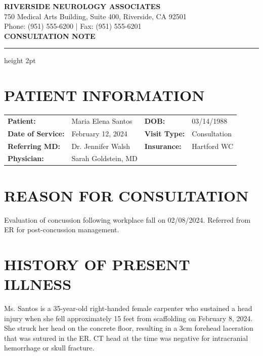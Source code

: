 \documentclass[11pt]{article}
\begin{document}
\begin{center}
{\Large\bfseries\color{neuroblue} RIVERSIDE NEUROLOGY ASSOCIATES}\\[0.3em]
{\small 750 Medical Arts Building, Suite 400, Riverside, CA 92501}\\
{\small Phone: (951) 555-6200 | Fax: (951) 555-6201}\\[1em]
{\LARGE\bfseries CONSULTATION NOTE}
\end{center}

\vspace{0.5em}
\hrule height 2pt
\vspace{1em}

\section*{PATIENT INFORMATION}

\begin{tabular}{@{}p{3.5cm}p{5cm}p{3cm}p{4cm}@{}}
\textbf{Patient:} & Maria Elena Santos & \textbf{DOB:} & 03/14/1988 \\
\textbf{Date of Service:} & February 12, 2024 & \textbf{Visit Type:} & Consultation \\
\textbf{Referring MD:} & Dr. Jennifer Walsh & \textbf{Insurance:} & Hartford WC \\
\textbf{Physician:} & Sarah Goldstein, MD & & \\
\end{tabular}

\section*{REASON FOR CONSULTATION}

Evaluation of concussion following workplace fall on 02/08/2024. Referred from ER for post-concussion management.

\section*{HISTORY OF PRESENT ILLNESS}

Ms. Santos is a 35-year-old right-handed female carpenter who sustained a head injury when she fell approximately 15 feet from scaffolding on February 8, 2024. She struck her head on the concrete floor, resulting in a 3cm forehead laceration that was sutured in the ER. CT head at the time was negative for intracranial hemorrhage or skull fracture.
\end{document}
